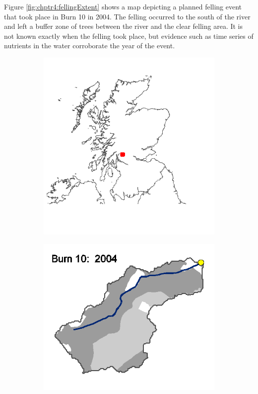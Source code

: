 Figure \ref{fig:chptr4:fellingExtent} shows a map depicting a planned felling event that took place in Burn 10 in 2004.  The felling occurred to the south of the river and left a buffer zone of trees between the river and the clear felling area.  It is not known exactly when the felling took place, but evidence such as time series of nutrients in the water corroborate the year of the event.

\begin{figure}
\centering
  \begin{subfigure}[b]{0.4\textwidth}
    \centering
    \includegraphics[width=\textwidth]{SiteMap}
    \caption{}
    \label{fig:chptr4:sitemap}
  \end{subfigure}
  \hfill
  \begin{subfigure}[b]{0.4\textwidth}
    \centering
    \includegraphics[width=\textwidth]{Burn10Felling2004}

\end{subfigure}
\end{figure}

